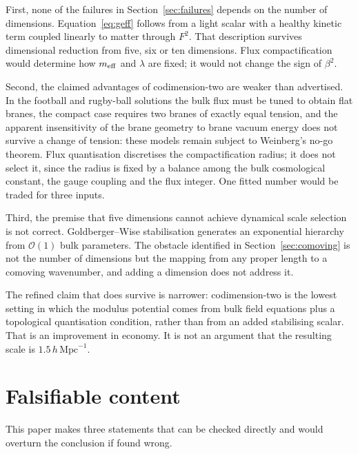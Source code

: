 \documentclass[11pt,a4paper]{article}
\newcommand{\hMpc}{h\,\mathrm{Mpc}^{-1}}
\newcommand{\meff}{m_{\rm eff}}
\begin{document}
First, none of the failures in Section~\ref{sec:failures} depends on the number of
dimensions. Equation~\eqref{eq:geff} follows from a light scalar with a healthy
kinetic term coupled linearly to matter through $F^2$. That description survives
dimensional reduction from five, six or ten dimensions. Flux compactification would
determine how $\meff$ and $\lambda$ are fixed; it would not change the sign of
$\beta^2$.

Second, the claimed advantages of codimension-two are weaker than advertised. In the
football and rugby-ball solutions the bulk flux must be tuned to obtain flat branes,
the compact case requires two branes of exactly equal tension, and the apparent
insensitivity of the brane geometry to brane vacuum energy does not survive a change
of tension: these models remain subject to Weinberg's no-go theorem. Flux
quantisation discretises the compactification radius; it does not select it, since
the radius is fixed by a balance among the bulk cosmological constant, the gauge
coupling and the flux integer. One fitted number would be traded for three inputs.

Third, the premise that five dimensions cannot achieve dynamical scale selection is
not correct. Goldberger--Wise stabilisation generates an exponential hierarchy from
$\mathcal{O}(1)$ bulk parameters. The obstacle identified in
Section~\ref{sec:comoving} is not the number of dimensions but the mapping from any
proper length to a comoving wavenumber, and adding a dimension does not address it.

The refined claim that does survive is narrower: codimension-two is the lowest
setting in which the modulus potential comes from bulk field equations plus a
topological quantisation condition, rather than from an added stabilising scalar.
That is an improvement in economy. It is not an argument that the resulting scale is
$1.5\,\hMpc$.

\section{Falsifiable content}\label{sec:predictions}

This paper makes three statements that can be checked directly and would overturn
the conclusion if found wrong.
\end{document}
